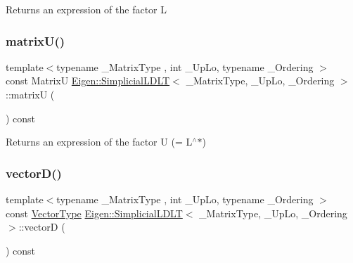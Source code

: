 \begin{DoxyReturn}{Returns}
an expression of the factor L 
\end{DoxyReturn}
\mbox{\label{class_eigen_1_1_simplicial_l_d_l_t_ae98ed1c7ce8f9165adf5fb08cbb36b70}} 
\subsubsection{\texorpdfstring{matrixU()}{matrixU()}}
{\footnotesize\ttfamily template$<$typename \+\_\+\+Matrix\+Type , int \+\_\+\+Up\+Lo, typename \+\_\+\+Ordering $>$ \\
const MatrixU \mbox{\hyperlink{class_eigen_1_1_simplicial_l_d_l_t}{Eigen\+::\+Simplicial\+L\+D\+LT}}$<$ \+\_\+\+Matrix\+Type, \+\_\+\+Up\+Lo, \+\_\+\+Ordering $>$\+::matrixU (\begin{DoxyParamCaption}{ }\end{DoxyParamCaption}) const\hspace{0.3cm}{\ttfamily [inline]}}

\begin{DoxyReturn}{Returns}
an expression of the factor U (= L$^\wedge$$\ast$) 
\end{DoxyReturn}
\mbox{\label{class_eigen_1_1_simplicial_l_d_l_t_abe54532ce80558a0474b11763702107b}} 
\subsubsection{\texorpdfstring{vectorD()}{vectorD()}}
{\footnotesize\ttfamily template$<$typename \+\_\+\+Matrix\+Type , int \+\_\+\+Up\+Lo, typename \+\_\+\+Ordering $>$ \\
const \mbox{\hyperlink{class_eigen_1_1_matrix}{Vector\+Type}} \mbox{\hyperlink{class_eigen_1_1_simplicial_l_d_l_t}{Eigen\+::\+Simplicial\+L\+D\+LT}}$<$ \+\_\+\+Matrix\+Type, \+\_\+\+Up\+Lo, \+\_\+\+Ordering $>$\+::vectorD (\begin{DoxyParamCaption}{ }\end{DoxyParamCaption}) const\hspace{0.3cm}{\ttfamily [inline]}}

